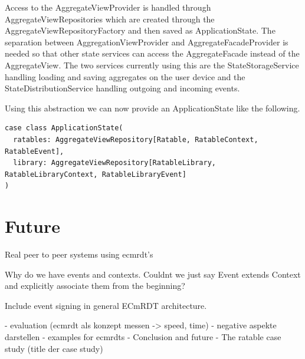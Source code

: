 \documentclass[
	ngerman,
	ruledheaders=section,   %
	class=report,		    %
	thesis={type=bachelor}, %
	accentcolor=9c,			%
	custommargins=true,    %
	marginpar=false,        %
	parskip=half-,          %
	fontsize=11pt,          %
]{tudapub}
\begin{document}
Access to the AggregateViewProvider is handled through AggregateViewRepositories which are created through the AggregateViewRepositoryFactory and then saved as ApplicationState. The separation between AggregationViewProvider and AggregateFacadeProvider is needed so that other state services can access the AggregateFacade instead of the AggregateView. The two services currently using this are the StateStorageService handling loading and saving aggregates on the user device and the StateDistributionService handling outgoing and incoming events. 

Using this abstraction we can now provide an ApplicationState like the following.

\begin{lstlisting}
case class ApplicationState(
  ratables: AggregateViewRepository[Ratable, RatableContext, RatableEvent],
  library: AggregateViewRepository[RatableLibrary, RatableLibraryContext, RatableLibraryEvent]
)
\end{lstlisting}

\chapter{Future}
Real peer to peer systems using ecmrdt's 

Why do we have events and contexts. Couldnt we just say Event extends Context and explicitly associate them from the beginning?

Include event signing in general ECmRDT architecture.

- evaluation (ecmrdt als konzept messen -> speed, time)
- negative aspekte darstellen
- examples for ecmrdts
- Conclusion and future
- The ratable case study (title der case study)
\end{document}
